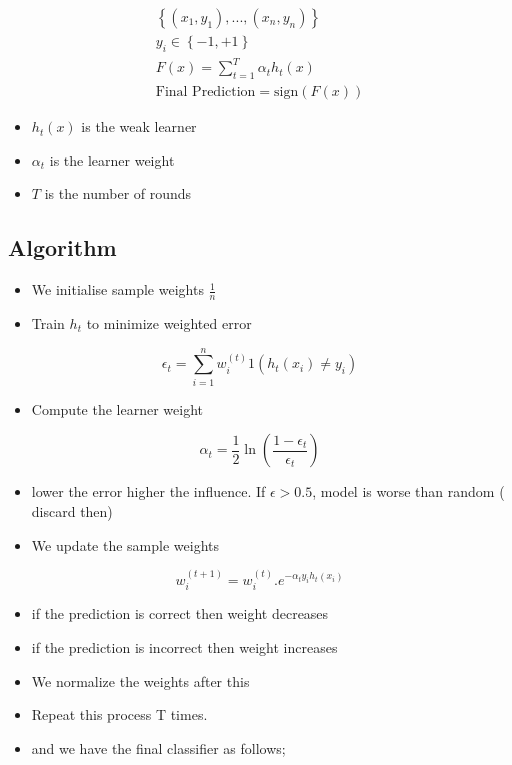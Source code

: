 \documentclass[10pt,a4paper]{article}
\newcommand{\Set}[1]{\left\{#1\right\}}
\begin{document}
		\begin{align*}
			\Set{(x_1,y_1),...,(x_n,y_n)}\\y_i \in \Set{-1,+1}\\F(x) = \sum_{t=1}^{T} \alpha_t h_t(x)\\ \text{Final Prediction} = \text{sign}(F(x))
		\end{align*}
	
	
		\begin{itemize}
			\item $h_t(x)$ is the weak learner
			\item $\alpha_t$  is the learner weight
			\item $T$ is the number of rounds
		\end{itemize}
	
		\subsection{Algorithm}
		\begin{itemize}
			\item We initialise sample weights $\frac{1}{n}$
			\item Train $h_t$ to minimize weighted error
		\end{itemize}
	
		$$		\epsilon_t = \sum_{i=1}^{n} w_i^{(t)} 1 (h_t(x_i) \neq y_i)
		$$
		\begin{itemize}
			\item Compute the learner weight
		\end{itemize}
	
		$$		\alpha_t = \frac{1}{2} \ln \left( \frac{1-\epsilon_t}{\epsilon_t}\right)
		$$
		\begin{itemize}
			\item lower the error higher the influence. If $\epsilon >0.5$, model is worse than random ( discard then)
		\end{itemize}
	
		\begin{itemize}
			\item We update the sample weights
		\end{itemize}
	
		$$	w_i^{(t+1)} = w_i^{(t)}.e^{-\alpha_t y_i h_t(x_i)}
		$$
		\begin{itemize}
			\item if the prediction is correct then weight decreases
			\item if the prediction is incorrect then weight increases
			\item We normalize the weights after this
			\item Repeat this process T times.
			\item and we have the final classifier as follows;
		\end{itemize}
	
\end{document}

